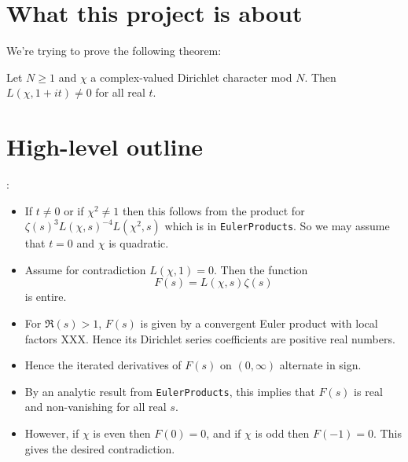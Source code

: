 %


\section{What this project is about}

We're trying to prove the following theorem:

\begin{theorem}
 Let $N \ge 1$ and $\chi$ a complex-valued Dirichlet character mod $N$. Then $L(\chi, 1 + it) \ne 0$ for all real $t$.
\end{theorem}

\section{High-level outline}:

\begin{itemize}

\item If $t \ne 0$ or if $\chi^2 \ne 1$ then this follows from the product for $\zeta(s)^3 L(\chi, s)^{-4} L(\chi^2, s)$ which is in \texttt{EulerProducts}. So we may assume that $t = 0$ and $\chi$ is quadratic.

\item Assume for contradiction $L(\chi, 1) = 0$. Then the function
\[ F(s) = L(\chi, s) \zeta(s) \]
is entire.

\item For $\Re(s) > 1$, $F(s)$ is given by a convergent Euler product with local factors XXX. Hence its Dirichlet series coefficients are positive real numbers.

\item Hence the iterated derivatives of $F(s)$ on $(0, \infty)$ alternate in sign.

\item By an analytic result from \texttt{EulerProducts}, this implies that $F(s)$ is real and non-vanishing for all real $s$.


\item However, if $\chi$ is even then $F(0) = 0$, and if $\chi$ is odd then $F(-1) = 0$. This gives the desired contradiction.
\end{itemize}

